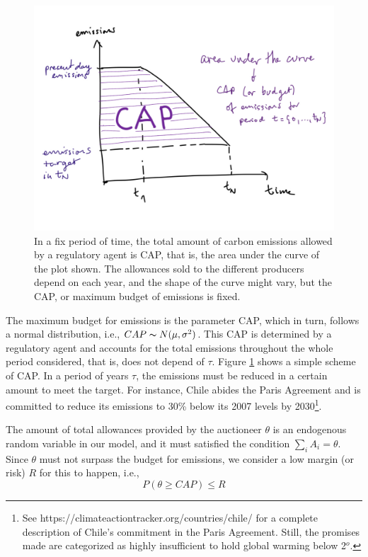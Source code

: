 \documentclass[11pt, letterpaper]{article}
\begin{document}
\begin{figure}[ht!]
 \includegraphics[width=\textwidth]{Informe/cap_scheme.jpeg}
 
 \caption{In a fix period of time, the total amount of carbon emissions allowed by a regulatory agent is CAP, that is, the area under the curve of the plot shown. The allowances sold to the different producers depend on each year, and the shape of the curve might vary, but the CAP, or maximum budget of emissions is fixed. }
 \label{cap-scheme}
\end{figure}

The maximum budget for emissions is the  parameter CAP, which in turn, follows a normal distribution, i.e., $CAP \thicksim N(\mu, \sigma^2)$. This CAP is determined by a regulatory agent and  accounts for the total emissions throughout the whole period considered, that is, does not depend of $\tau$. Figure \ref{cap-scheme} shows a simple scheme of CAP. In a period of years $\tau$, the emissions must be reduced in a certain amount to meet the target. For instance, Chile abides the Paris Agreement and is committed to reduce its emissions to 30\% below its 2007 levels by 2030\footnote{See https://climateactiontracker.org/countries/chile/ for a complete description of Chile's commitment in the Paris Agreement. Still, the promises made are categorized as highly insufficient to hold global warming below 2$^o$. }.

\smallskip
The amount of total allowances provided by the auctioneer $\theta$ is an endogenous random variable in our model, and it must satisfied the condition $\sum_i A_i = \theta$. 
Since $\theta$ must not surpass the budget for emissions, we consider a low margin (or risk) $R$ for this to happen, i.e.,
\begin{equation}
    P (\theta \geq CAP) \leq R
\end{equation}
\end{document}
